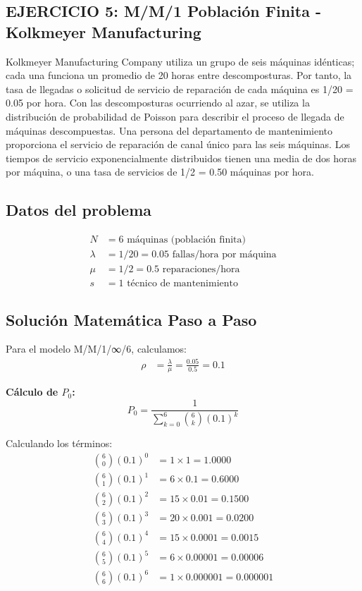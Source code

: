 \documentclass[12pt, a4paper, oneside]{book}
\theoremstyle{definition}
\begin{document}
\begin{center}
\begin{center}
\section{EJERCICIO 5: M/M/1 Población Finita - Kolkmeyer Manufacturing}

Kolkmeyer Manufacturing Company utiliza un grupo de seis máquinas idénticas; cada una funciona un promedio de 20 horas entre descomposturas. Por tanto, la tasa de llegadas o solicitud de servicio de reparación de cada máquina es 1/20 = 0.05 por hora. Con las descomposturas ocurriendo al azar, se utiliza la distribución de probabilidad de Poisson para describir el proceso de llegada de máquinas descompuestas. Una persona del departamento de mantenimiento proporciona el servicio de reparación de canal único para las seis máquinas. Los tiempos de servicio exponencialmente distribuidos tienen una media de dos horas por máquina, o una tasa de servicios de 1/2 = 0.50 máquinas por hora.

\subsection{Datos del problema}
\begin{align*}
N &= 6 \text{ máquinas (población finita)} \\
\lambda &= 1/20 = 0.05 \text{ fallas/hora por máquina} \\
\mu &= 1/2 = 0.5 \text{ reparaciones/hora} \\
s &= 1 \text{ técnico de mantenimiento}
\end{align*}

\subsection{Solución Matemática Paso a Paso}

Para el modelo M/M/1/∞/6, calculamos:
\begin{align*}
\rho &= \frac{\lambda}{\mu} = \frac{0.05}{0.5} = 0.1
\end{align*}

\textbf{Cálculo de $P_0$:}
$$P_0 = \frac{1}{\sum_{k=0}^{6} \binom{6}{k} (0.1)^k}$$

Calculando los términos:
\begin{align*}
\binom{6}{0}(0.1)^0 &= 1 \times 1 = 1.0000 \\
\binom{6}{1}(0.1)^1 &= 6 \times 0.1 = 0.6000 \\
\binom{6}{2}(0.1)^2 &= 15 \times 0.01 = 0.1500 \\
\binom{6}{3}(0.1)^3 &= 20 \times 0.001 = 0.0200 \\
\binom{6}{4}(0.1)^4 &= 15 \times 0.0001 = 0.0015 \\
\binom{6}{5}(0.1)^5 &= 6 \times 0.00001 = 0.00006 \\
\binom{6}{6}(0.1)^6 &= 1 \times 0.000001 = 0.000001
\end{align*}


\end{center}
\end{center}
\end{document}
